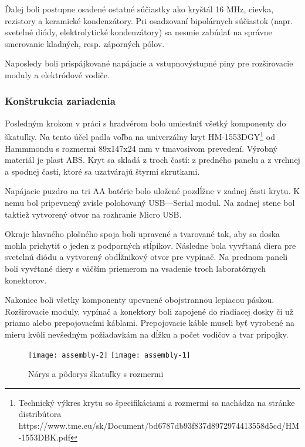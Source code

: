 \documentclass[titlepage]{article}
\begin{document}
Ďalej boli postupne osadené ostatné súčiastky ako kryštál 16 MHz, cievka, rezistory a keramické kondenzátory. Pri osadzovaní bipolárnych súčiastok (napr. svetelné diódy, elektrolytické kondenzátory) sa nesmie zabúdať na správne smerovanie kladných, resp. záporných pólov.

Naposledy boli prispájkované napájacie a vstupnovýstupné piny pre rozširovacie moduly a elektródové vodiče.

\newpage
\subsubsection{Konštrukcia zariadenia}
Posledným krokom v práci s hradvérom bolo umiestniť všetký komponenty do škatuľky. Na tento účel padla voľba na univerzálny kryt HM-1553DGY\footnote{Technický výkres krytu so špecifikáciami a rozmermi sa nachádza na stránke distribútora https://www.tme.eu/sk/Document/bd6787db93f837d8972974413558d5cd/HM-1553DBK.pdf} od Hammmondu s rozmermi 89x147x24 mm v tmavosivom prevedení. Výrobný materiál je plast ABS. Kryt sa skladá z troch častí: z predného panelu a z vrchnej a spodnej časti, ktoré sa uzatvárajú štyrmi skrutkami. 

Napájacie puzdro na tri AA batérie bolo uložené pozdĺžne v zadnej časti krytu. K nemu bol pripevnený zvisle polohovaný USB—Serial modul. Na zadnej stene bol taktiež vytvorený otvor na rozhranie Micro USB.

Okraje hlavného plošného spoja boli upravené a tvarované tak, aby sa doska mohla prichytiť o jeden z podporných stĺpikov. Následne bola vyvŕtaná diera pre svetelnú diódu a vytvorený obdĺžnikový otvor pre vypínač. Na prednom paneli boli vyvŕtané diery s väčším priemerom na vsadenie troch laboratórnych konektorov.

Nakoniec boli všetky komponenty upevnené obojstrannou lepiacou páskou. Rozširovacie moduly, vypínač a konektory boli zapojené do riadiacej dosky či už priamo alebo prepojovacími káblami. Prepojovacie káble museli byť vyrobené na mieru kvôli nevšedným požiadavkám na dĺžku a počet vodičov a tvar prípojky.


\begin{figure}[!ht]
\begin{center}
\texttt{[image: assembly-2]}
\texttt{[image: assembly-1]}
\caption{Nárys a pôdorys škatuľky s rozmermi}
\end{center}
\end{figure}


\newpage
\end{document}

